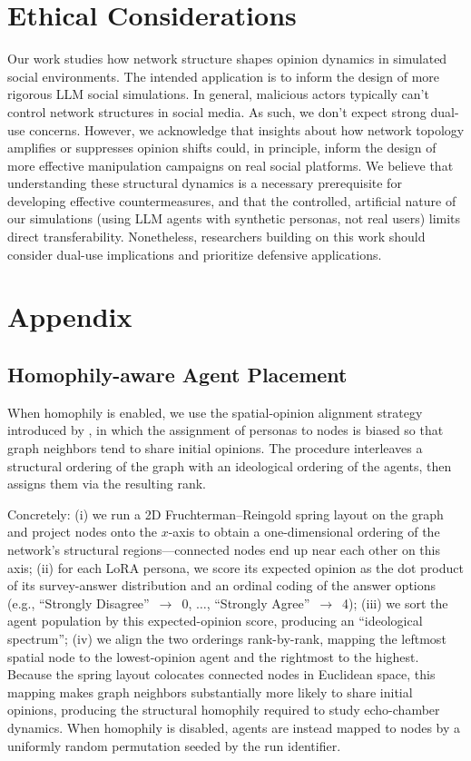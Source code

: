 \documentclass[11pt]{article}
\begin{document}
\section{Ethical Considerations}

Our work studies how network structure shapes opinion dynamics in simulated social environments. The intended application is to inform the design of more rigorous LLM social simulations. In general, malicious actors typically can't control network structures in social media. As such, we don't expect strong dual-use concerns. However, we acknowledge that insights about how network topology amplifies or suppresses opinion shifts could, in principle, inform the design of more effective manipulation campaigns on real social platforms. We believe that understanding these structural dynamics is a necessary prerequisite for developing effective countermeasures, and that the controlled, artificial nature of our simulations (using LLM agents with synthetic personas, not real users) limits direct transferability. Nonetheless, researchers building on this work should consider dual-use implications and prioritize defensive applications.




\appendix
\section{Appendix}

\subsection{Homophily-aware Agent Placement}
\label{appendix_homophily}

When homophily is enabled, we use the spatial-opinion alignment strategy introduced by \citet{bückkaeffer2026textitsiliconsocietycookbookdesign}, in which the assignment of personas to nodes is biased so that graph neighbors tend to share initial opinions. The procedure interleaves a structural ordering of the graph with an ideological ordering of the agents, then assigns them via the resulting rank.

Concretely: (i) we run a 2D Fruchterman--Reingold spring layout on the graph and project nodes onto the $x$-axis to obtain a one-dimensional ordering of the network's structural regions---connected nodes end up near each other on this axis; (ii) for each LoRA persona, we score its expected opinion as the dot product of its survey-answer distribution and an ordinal coding of the answer options (e.g., ``Strongly Disagree''~$\to$~0, $\ldots$, ``Strongly Agree''~$\to$~4); (iii) we sort the agent population by this expected-opinion score, producing an ``ideological spectrum''; (iv) we align the two orderings rank-by-rank, mapping the leftmost spatial node to the lowest-opinion agent and the rightmost to the highest. Because the spring layout colocates connected nodes in Euclidean space, this mapping makes graph neighbors substantially more likely to share initial opinions, producing the structural homophily required to study echo-chamber dynamics. When homophily is disabled, agents are instead mapped to nodes by a uniformly random permutation seeded by the run identifier.
\end{document}
